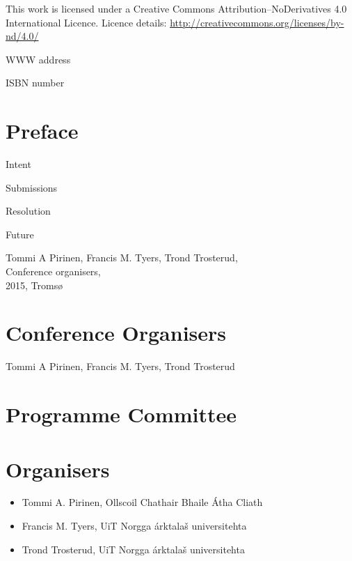 \documentclass[b5paper]{book}
\begin{document}
\frontmatter

\cleardoublepage
\thispagestyle{empty}
{\centering{}}

This work is licensed under a Creative Commons Attribution–NoDerivatives
4.0 International Licence.  Licence details:
\url{http://creativecommons.org/licenses/by-nd/4.0/}

WWW address

ISBN number

\clearpage

\section*{Preface}

Intent

Submissions

Resolution

Future

Tommi A Pirinen, Francis M. Tyers, Trond Trosterud,\\
Conference organisers,\\
2015, Tromsø

\section*{Conference Organisers}

Tommi A Pirinen, Francis M. Tyers, Trond Trosterud

\section*{Programme Committee}

\section*{Organisers}

\begin{itemize}
    \item Tommi A. Pirinen, Ollscoil Chathair Bhaile Átha Cliath
    \item Francis M. Tyers, UiT Norgga árktalaš universitehta
    \item Trond Trosterud, UiT Norgga árktalaš universitehta
\end{itemize}
\end{document}
